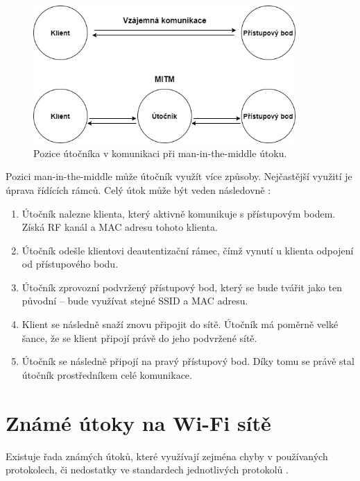 \begin{figure}[htbp]
  \centering
  \includegraphics[width=10cm]{obrazky-figures/mitm.png}
  \caption{Pozice útočníka v komunikaci při man-in-the-middle útoku.}
  \label{img:mitm}
\end{figure}

Pozici man-in-the-middle může útočník využít více způsoby. Nejčastější využití je úprava řídících rámců. Celý útok může být veden následovně \cite{beaver2015hacking}:
\begin{enumerate}
  \item{Útočník nalezne klienta, který aktivně komunikuje s přístupovým bodem. Získá RF kanál a MAC adresu tohoto klienta.}
  \item{Útočník odešle klientovi deautentizační rámec, čímž vynutí u klienta odpojení od přístupového bodu.}
  \item{Útočník zprovozní podvržený přístupový bod, který se bude tvářit jako ten původní -- bude využívat stejné SSID a MAC adresu.}
  \item{Klient se následně snaží znovu připojit do sítě. Útočník má poměrně velké šance, že se klient připojí právě do jeho podvržené sítě.}
  \item{Útočník se následně připojí na pravý přístupový bod. Díky tomu se právě stal útočník prostředníkem celé komunikace.}
\end{enumerate}

\section{Známé útoky na Wi-Fi sítě}
Existuje řada známých útoků, které využívají zejména chyby v používaných protokolech, či nedostatky ve standardech jednotlivých protokolů \cite{kohlios2018comprehensive}.

